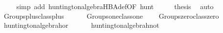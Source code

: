 \begin{isabellebody}
\ \ \ \ \isamarkupfalse%
\ {}simp\ add{}\ huntington{}algebra{}HBA{}def{}OF\ hunt{}{}\isanewline
\isanewline
\ \ \isamarkupfalse%
\ \isamarkupfalse%
\ {}thesis\ \isamarkupfalse%
\ auto\isanewline
{}\isamarkupfalse%
%
\endisatagproof
{\isafoldproof}%
%
\isadelimproof
\isanewline
%
\endisadelimproof
\isanewline
{}\isamarkupfalse%
\isanewline
\ \ Groups{}plus{}class{}plus\ {}\ {}{}{}\ {}{}{}\ \isanewline
\ \ Groups{}one{}class{}one\ {}{}{}{}{}\ \isanewline
\ \ Groups{}zero{}class{}zero\ {}{}{}{}{}\isanewline
\isanewline
{}\isamarkupfalse%
\isanewline
\ \ huntington{}algebra{}hor\ {}\ {}{}{}{}\ {}{}{}\ \isanewline
\ \ huntington{}algebra{}hnot\ {}{}{}{}{}{}\isanewline

\end{isabellebody}
